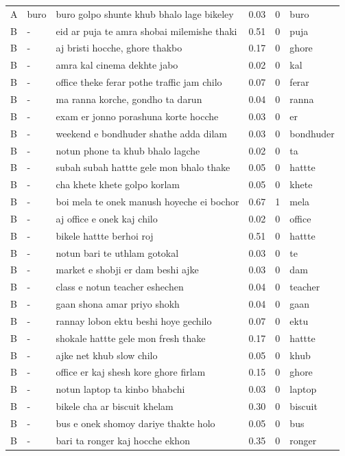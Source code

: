 \begin{tabular}{lllrrl}
A & buro & buro golpo shunte khub bhalo lage bikeley & 0.03 & 0 & buro \\
B & - & eid ar puja te amra shobai milemishe thaki & 0.51 & 0 & puja \\
B & - & aj bristi hocche, ghore thakbo & 0.17 & 0 & ghore \\
B & - & amra kal cinema dekhte jabo & 0.02 & 0 & kal \\
B & - & office theke ferar pothe traffic jam chilo & 0.07 & 0 & ferar \\
B & - & ma ranna korche, gondho ta darun & 0.04 & 0 & ranna \\
B & - & exam er jonno porashuna korte hocche & 0.03 & 0 & er \\
B & - & weekend e bondhuder shathe adda dilam & 0.03 & 0 & bondhuder \\
B & - & notun phone ta khub bhalo lagche & 0.02 & 0 & ta \\
B & - & subah subah hattte gele mon bhalo thake & 0.05 & 0 & hattte \\
B & - & cha khete khete golpo korlam & 0.05 & 0 & khete \\
B & - & boi mela te onek manush hoyeche ei bochor & 0.67 & 1 & mela \\
B & - & aj office e onek kaj chilo & 0.02 & 0 & office \\
B & - & bikele hattte berhoi roj & 0.51 & 0 & hattte \\
B & - & notun bari te uthlam gotokal & 0.03 & 0 & te \\
B & - & market e shobji er dam beshi ajke & 0.03 & 0 & dam \\
B & - & class e notun teacher eshechen & 0.04 & 0 & teacher \\
B & - & gaan shona amar priyo shokh & 0.04 & 0 & gaan \\
B & - & rannay lobon ektu beshi hoye gechilo & 0.07 & 0 & ektu \\
B & - & shokale hattte gele mon fresh thake & 0.17 & 0 & hattte \\
B & - & ajke net khub slow chilo & 0.05 & 0 & khub \\
B & - & office er kaj shesh kore ghore firlam & 0.15 & 0 & ghore \\
B & - & notun laptop ta kinbo bhabchi & 0.03 & 0 & laptop \\
B & - & bikele cha ar biscuit khelam & 0.30 & 0 & biscuit \\
B & - & bus e onek shomoy dariye thakte holo & 0.05 & 0 & bus \\
B & - & bari ta ronger kaj hocche ekhon & 0.35 & 0 & ronger \\

\end{tabular}
